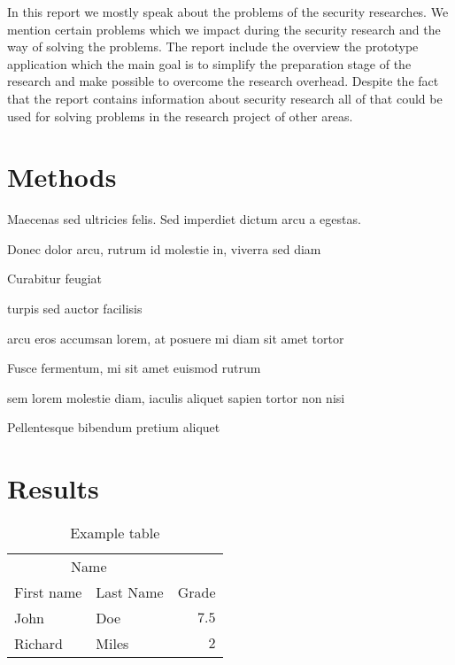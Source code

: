 \documentclass[twoside]{article}
\begin{document}
In this report we mostly speak about the problems of the security researches. We mention certain problems which we impact during the security research and the way of solving the problems. The report include the overview the prototype application which the main goal is to simplify the preparation stage of the research and make possible to overcome the research overhead. Despite the fact that the report contains information about security research all of that could be used for solving problems in the research project of other areas.      

  

\section{Methods}

Maecenas sed ultricies felis. Sed imperdiet dictum arcu a egestas. 
\begin{compactitem}
\item Donec dolor arcu, rutrum id molestie in, viverra sed diam
\item Curabitur feugiat
\item turpis sed auctor facilisis
\item arcu eros accumsan lorem, at posuere mi diam sit amet tortor
\item Fusce fermentum, mi sit amet euismod rutrum
\item sem lorem molestie diam, iaculis aliquet sapien tortor non nisi
\item Pellentesque bibendum pretium aliquet
\end{compactitem}
\lipsum[4] %


\section{Results}

\begin{table}[H]
\caption{Example table}
\centering
\begin{tabular}{llr}
\toprule
\multicolumn{2}{c}{Name} \\
\cmidrule(r){1-2}
First name & Last Name & Grade \\
\midrule
John & Doe & $7.5$ \\
Richard & Miles & $2$ \\
\bottomrule
\end{tabular}
\end{table}
\end{document}
